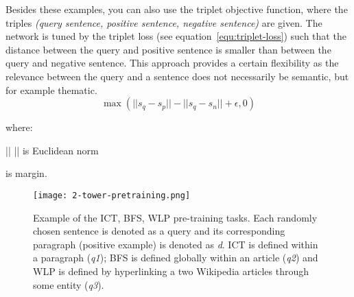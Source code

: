     Besides these examples, you can also use the triplet objective function, where the triples \emph{(query sentence, positive sentence, negative sentence)} are given. The network is tuned by the triplet loss (see equation~\ref{equ:triplet-loss}) such that the distance between the query and positive sentence is smaller than between the query and negative sentence. This approach provides a certain flexibility as the relevance between the query and a sentence does not necessarily be semantic, but for example thematic.~\parencite{ein-dor-etal-2018-learning}
    \begin{equation} 
        \label{equ:triplet-loss}
        \max(||s_q-s_p|| - ||s_q-s_n|| + \epsilon, 0)
    \end{equation}
    
    where:
    \begin{where}
        \item [|| \cdot ||] is Euclidean norm
        \item [\epsilon] is margin.
    \end{where}

    \begin{figure}[H]
        \texttt{[image: 2-tower-pretraining.png]}
        \centering
        \caption[Pre-training tasks]{Example of the ICT, BFS, WLP pre-training tasks. Each randomly chosen sentence is denoted as a query and its corresponding paragraph (positive example) is denoted as \emph{d}. ICT is defined within a paragraph (\emph{q1}); BFS is defined globally within an article (\emph{q2}) and WLP is defined by hyperlinking a two Wikipedia articles through some entity (\emph{q3}).~\parencite{chang2020twotower}}
        \label{fig:two-tower-pretraining}
    \end{figure}

